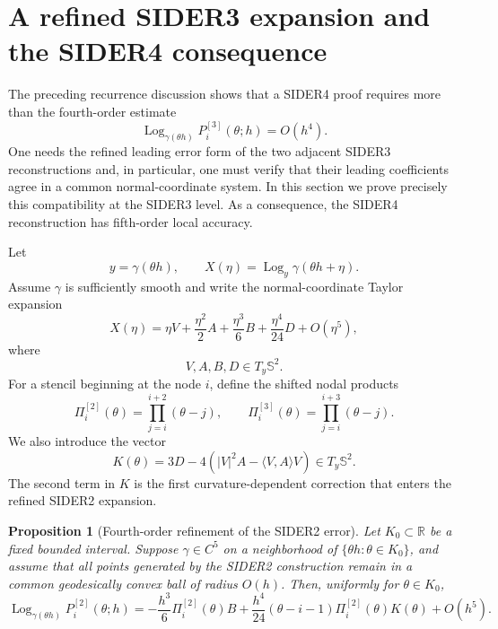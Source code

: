 \documentclass[a4paper,11pt]{article}
\newcommand{\bS}{\mathbb{S}}
\newcommand{\bR}{\mathbb{R}}
\newcommand{\Log}{\operatorname{Log}}
\newtheorem{prop}{Proposition}
\numberwithin{equation}{section}
\begin{document}
\section{A refined SIDER3 expansion and the SIDER4 consequence}
\label{sec:sider4_refined}

The preceding recurrence discussion shows that a SIDER4 proof requires more
than the fourth-order estimate
\[
        \Log_{\gamma(\theta h)}P_i^{[3]}(\theta;h)=O(h^4).
\]
One needs the refined leading error form of the two adjacent SIDER3
reconstructions and, in particular, one must verify that their leading
coefficients agree in a common normal-coordinate system.  In this section we
prove precisely this compatibility at the SIDER3 level.  As a consequence, the
SIDER4 reconstruction has fifth-order local accuracy.

Let
\[
        y=\gamma(\theta h),
        \qquad
        X(\eta)=\Log_y\gamma(\theta h+\eta).
\]
Assume \(\gamma\) is sufficiently smooth and write the normal-coordinate
Taylor expansion
\begin{equation}
\label{eq:normal_taylor_sider4}
        X(\eta)
        =
        \eta V+\frac{\eta^2}{2}A+\frac{\eta^3}{6}B
        +\frac{\eta^4}{24}D+O(\eta^5),
\end{equation}
where
\[
        V,A,B,D\in T_y\bS^2.
\]
For a stencil beginning at the node \(i\), define the shifted nodal products
\[
        \Pi_i^{[2]}(\theta)
        =
        \prod_{j=i}^{i+2}(\theta-j),
        \qquad
        \Pi_i^{[3]}(\theta)
        =
        \prod_{j=i}^{i+3}(\theta-j).
\]
We also introduce the vector
\begin{equation}
\label{eq:K_vector}
        K(\theta)
        =
        3D
        -
        4\left(|V|^2A-\langle V,A\rangle V\right)
        \in T_y\bS^2 .
\end{equation}
The second term in \(K\) is the first curvature-dependent correction that
enters the refined SIDER2 expansion.

\begin{prop}[Fourth-order refinement of the SIDER2 error]
\label{prop:sider2_fourth_refined}
Let \(K_0\subset\bR\) be a fixed bounded interval.  Suppose
\(\gamma\in C^5\) on a neighborhood of
\(\{\theta h:\theta\in K_0\}\), and assume that all points generated by the
SIDER2 construction remain in a common geodesically convex ball of radius
\(O(h)\).  Then, uniformly for \(\theta\in K_0\),
\begin{equation}
\label{eq:sider2_fourth_refined}
\Log_{\gamma(\theta h)} P_i^{[2]}(\theta;h)
=
-\frac{h^3}{6}\Pi_i^{[2]}(\theta)B
+
\frac{h^4}{24}
(\theta-i-1)\Pi_i^{[2]}(\theta)K(\theta)
+
O(h^5).
\end{equation}
\end{prop}
\end{document}
